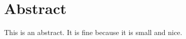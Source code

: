 
\chapter*{Abstract}

\begin{center}
  \begin{minipage}{12cm}
    \begin{sloppypar}
    	This is an abstract. It is fine because it is small and nice.
    \end{sloppypar}
  \end{minipage}
\end{center}